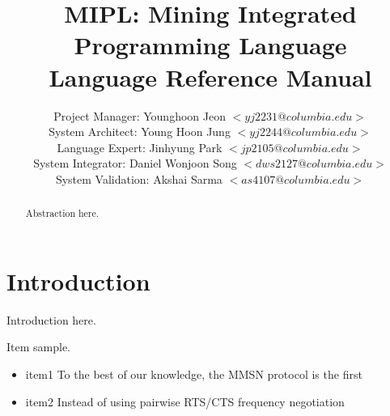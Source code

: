 \documentclass[prodmode,acmtecs]{acmsmall}
\begin{document}

\title{{MIPL: Mining Integrated Programming Language\\
Language Reference Manual}}
\author{Project Manager: Younghoon Jeon $<yj2231@columbia.edu>$\\
System Architect: Young Hoon Jung $<yj2244@columbia.edu>$\\
Language Expert: Jinhyung Park $<jp2105@columbia.edu>$\\
System Integrator: Daniel Wonjoon Song $<dws2127@columbia.edu>$\\
System Validation: Akshai Sarma $<as4107@columbia.edu>$
}

\begin{abstract}
Abstraction here.
\end{abstract}






\maketitle


\lstset{frame=single}

\section{Introduction}

Introduction here.

Item sample.
\begin{itemize}
\item item1 To the best of our knowledge, the MMSN protocol is the first
\item item2 Instead of using pairwise RTS/CTS frequency negotiation
\end{itemize}
\end{document}
